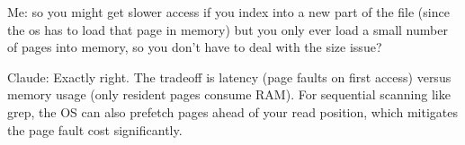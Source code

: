 \documentclass[letterpaper,twocolumn,10pt]{article}
\begin{document}
Me: so you might get slower access if you index into a new part of the file (since the os has to load that page in memory) but you only ever load a small number of pages into memory, so you don't have to deal with the size issue?

Claude: Exactly right. The tradeoff is latency (page faults on first access) versus memory usage (only resident pages consume RAM). For sequential scanning like grep, the OS can also prefetch pages ahead of your read position, which mitigates the page fault cost significantly.
\end{document}
